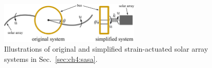 \begin{figure}[t]
\centering
\includegraphics[width=0.6\textwidth]{../ch4/figures/sasa_schematic}
\caption[Illustrations of original and simplified strain-actuated solar array systems]{Illustrations of original and simplified strain-actuated solar array systems in Sec.~\ref{sec:ch4:sasa}. \label{fig:ch4:sasa_schematic}}
\end{figure}
